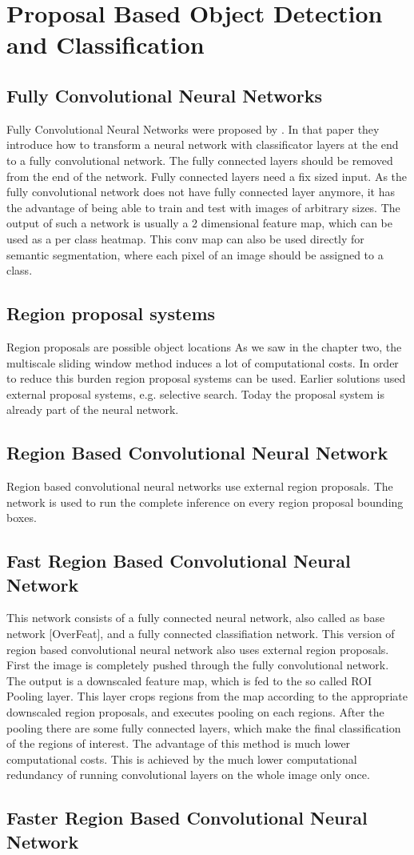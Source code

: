 \chapter{Proposal Based Object Detection and Classification}

\section{Fully Convolutional Neural Networks}
Fully Convolutional Neural Networks were proposed by . In that paper they introduce how to transform a neural network with classificator layers at the end to a fully convolutional network. The fully connected layers should be removed from the end of the network.
Fully connected layers need a fix sized input. As the fully convolutional network does not have  fully connected layer anymore, it has the advantage of being able to train and test with images of arbitrary sizes.
The output of such a network is usually a 2 dimensional feature map, which can be used as a per class heatmap. This conv map can also be used directly for semantic segmentation, where each pixel of an image should be assigned to a class.

\section{Region proposal systems}
Region proposals are possible object locations As we saw in the chapter two, the multiscale sliding window method induces a lot of computational costs. In order to reduce this burden region proposal systems can be used. Earlier solutions used external proposal systems, e.g. selective search. Today the proposal system is already part of the neural network. 

\section{Region Based Convolutional Neural Network}
Region based convolutional neural networks use external region proposals. The network is used to run the complete inference on every region proposal bounding boxes. 

\section{Fast Region Based Convolutional Neural Network} This network consists of a fully connected neural network, also called as base network [OverFeat], and a fully connected classifiation network. This version of region based convolutional neural network also uses external region proposals. First the image is completely pushed through the fully convolutional network. The output is a downscaled feature map, which is fed to the so called ROI Pooling layer. This layer crops regions from the map according to the appropriate downscaled region proposals, and executes pooling on each regions. After the pooling there are some fully connected layers, which make the final classification of the regions of interest. The advantage of this method is much lower computational costs. This is achieved by the much lower computational redundancy of running convolutional layers on the whole image only once. 

\section{Faster Region Based Convolutional Neural Network}
